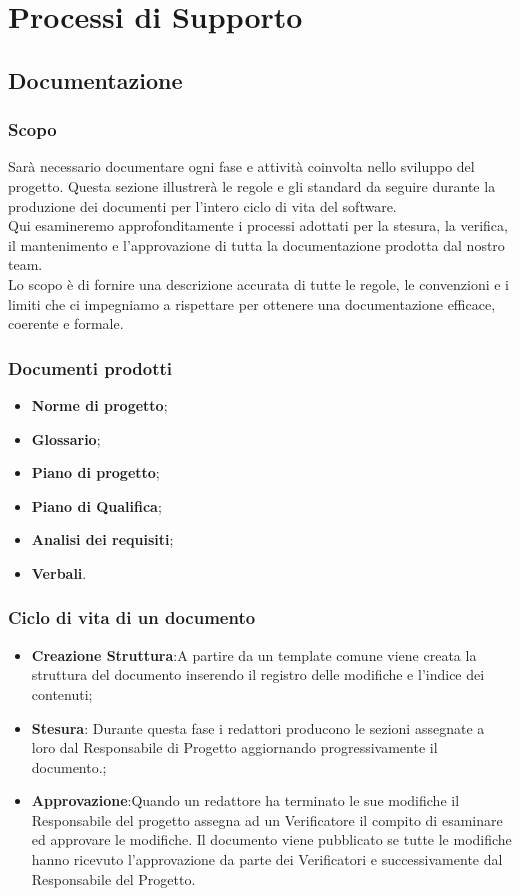 \section{Processi di Supporto}

\subsection{Documentazione}
\subsubsection{Scopo}
Sarà necessario documentare ogni fase e attività coinvolta nello sviluppo del progetto. Questa sezione illustrerà le regole e gli standard da seguire durante la produzione 
dei documenti per l'intero ciclo di vita del software. \\
Qui esamineremo approfonditamente i processi adottati per la stesura, la verifica, il mantenimento e l’approvazione di tutta la documentazione prodotta dal nostro team. \\
Lo scopo è di fornire una descrizione accurata di tutte le regole, le convenzioni e i limiti che ci impegniamo a rispettare per ottenere una documentazione efficace, coerente e formale.\\

\subsubsection{Documenti prodotti}
\begin{itemize}
    \item \textbf{Norme di progetto};
    \item \textbf{Glossario};
    \item \textbf{Piano di progetto};
    \item \textbf{Piano di Qualifica};
    \item \textbf{Analisi dei requisiti};
    \item \textbf{Verbali}.
\end{itemize}

\subsubsection{Ciclo di vita di un documento}
\begin{itemize}
    \item \textbf{Creazione Struttura}:A partire da un template comune viene creata la struttura del documento inserendo il registro delle modifiche e l’indice dei contenuti;
    \item \textbf{Stesura}: Durante questa fase i redattori producono le sezioni assegnate a loro dal Responsabile di Progetto aggiornando progressivamente il documento.;
    \item \textbf{Approvazione}:Quando un redattore ha terminato le sue modifiche il Responsabile del progetto assegna ad un Verificatore il compito di esaminare ed approvare le modifiche.
Il documento viene pubblicato se tutte le modifiche hanno ricevuto l’approvazione da parte dei Verificatori e successivamente dal Responsabile del Progetto.
\end{itemize}

